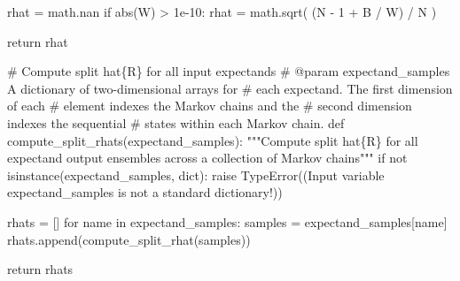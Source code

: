 \documentclass[
  letterpaper,
  DIV=11,
  numbers=noendperiod]{scrartcl}
\newenvironment{Shaded}{\begin{snugshade}}{\end{snugshade}}
\newcommand{\BuiltInTok}[1]{\textcolor[rgb]{0.00,0.23,0.31}{#1}}
\newcommand{\CommentTok}[1]{\textcolor[rgb]{0.37,0.37,0.37}{#1}}
\newcommand{\ControlFlowTok}[1]{\textcolor[rgb]{0.00,0.23,0.31}{#1}}
\newcommand{\DecValTok}[1]{\textcolor[rgb]{0.68,0.00,0.00}{#1}}
\newcommand{\FloatTok}[1]{\textcolor[rgb]{0.68,0.00,0.00}{#1}}
\newcommand{\KeywordTok}[1]{\textcolor[rgb]{0.00,0.23,0.31}{#1}}
\newcommand{\NormalTok}[1]{\textcolor[rgb]{0.00,0.23,0.31}{#1}}
\newcommand{\OperatorTok}[1]{\textcolor[rgb]{0.37,0.37,0.37}{#1}}
\newcommand{\PreprocessorTok}[1]{\textcolor[rgb]{0.68,0.00,0.00}{#1}}
\newcommand{\StringTok}[1]{\textcolor[rgb]{0.13,0.47,0.30}{#1}}
\begin{document}
\begin{Shaded}
\begin{Highlighting}[]
\NormalTok{  rhat }\OperatorTok{=}\NormalTok{ math.nan}
  \ControlFlowTok{if} \BuiltInTok{abs}\NormalTok{(W) }\OperatorTok{\textgreater{}} \FloatTok{1e{-}10}\NormalTok{:}
\NormalTok{    rhat }\OperatorTok{=}\NormalTok{ math.sqrt( (N }\OperatorTok{{-}} \DecValTok{1} \OperatorTok{+}\NormalTok{ B }\OperatorTok{/}\NormalTok{ W) }\OperatorTok{/}\NormalTok{ N )}
  
  \ControlFlowTok{return}\NormalTok{ rhat}
\end{Highlighting}
\end{Shaded}

\begin{Shaded}
\begin{Highlighting}[]
\CommentTok{\# Compute split hat\{R\} for all input expectands}
\CommentTok{\# @param expectand\_samples A dictionary of two{-}dimensional arrays for}
\CommentTok{\#                          each expectand.  The first dimension of each}
\CommentTok{\#                          element indexes the Markov chains and the}
\CommentTok{\#                          second dimension indexes the sequential}
\CommentTok{\#                          states within each Markov chain.}
\KeywordTok{def}\NormalTok{ compute\_split\_rhats(expectand\_samples):}
  \CommentTok{"""Compute split hat\{R\} for all expectand output ensembles across}
\CommentTok{     a collection of Markov chains"""}
  \ControlFlowTok{if} \KeywordTok{not} \BuiltInTok{isinstance}\NormalTok{(expectand\_samples, }\BuiltInTok{dict}\NormalTok{):}
    \ControlFlowTok{raise} \PreprocessorTok{TypeError}\NormalTok{((}\StringTok{\textquotesingle{}Input variable \textasciigrave{}expectand\_samples\textasciigrave{} \textquotesingle{}}
           \StringTok{\textquotesingle{}is not a standard dictionary!\textquotesingle{}}\NormalTok{))}
    
\NormalTok{  rhats }\OperatorTok{=}\NormalTok{ []}
  \ControlFlowTok{for}\NormalTok{ name }\KeywordTok{in}\NormalTok{ expectand\_samples:}
\NormalTok{    samples }\OperatorTok{=}\NormalTok{ expectand\_samples[name]}
\NormalTok{    rhats.append(compute\_split\_rhat(samples))}
  
  \ControlFlowTok{return}\NormalTok{ rhats}
\end{Highlighting}
\end{Shaded}
\end{document}
